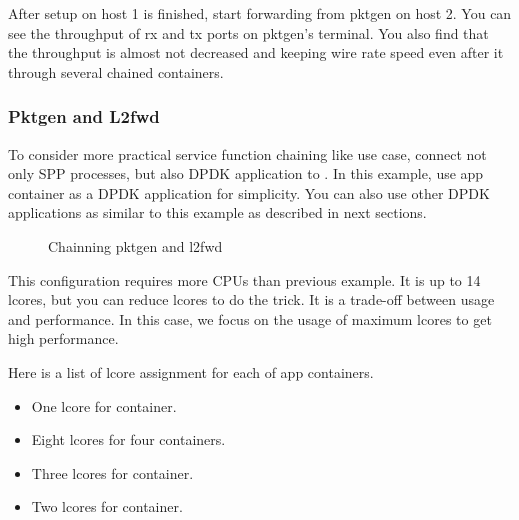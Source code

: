 \documentclass[a4paper,11pt,openany,oneside,english]{sphinxmanual}
\begin{document}
After setup on host 1 is finished, start forwarding from pktgen on host 2.
You can see the throughput of rx and tx ports on pktgen’s terminal.
You also find that the throughput is almost not decreased and keeping wire
rate speed even after it through several chained containers.


\subsubsection{Pktgen and L2fwd}
\label{\detokenize{tools/sppc/usecases:pktgen-and-l2fwd}}\label{\detokenize{tools/sppc/usecases:sppc-usecases-pktgen-l2fwd}}
To consider more practical service function chaining like use case,
connect not only SPP processes, but also DPDK application to .
In this example, use  app container as a DPDK application
for simplicity.
You can also use other DPDK applications as similar to this example
as described in next sections.

\begin{figure}[htbp]
\centering
\capstart

\noindent{}
\caption{Chainning pktgen and l2fwd}\label{\detokenize{tools/sppc/usecases:id3}}\label{\detokenize{tools/sppc/usecases:figure-sppc-usecase-l2fwdpktgen}}\end{figure}

This configuration requires more CPUs than previous example.
It is up to 14 lcores, but you can reduce lcores to do the trick.
It is a trade-off between usage and performance.
In this case, we focus on the usage of maximum lcores to get high
performance.

Here is a list of lcore assignment for each of app containers.
\begin{itemize}
\item {} 
One lcore for  container.

\item {} 
Eight lcores for four  containers.

\item {} 
Three lcores for  container.

\item {} 
Two lcores for  container.

\end{itemize}
\end{document}
